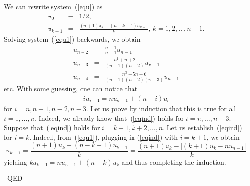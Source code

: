 \documentclass[12pt]{article}
\newenvironment{proof}{{\sc Proof:}}{~\hfill QED}
\begin{document}
\begin{proof}
We can rewrite system~(\ref{equ}) as
\begin{eqnarray}\label{equ1}
u_0&=&1/2, \\
u_{k-1}&=&\frac{{(n+1) u_{k}-(n-k-1)u_{k+1}}}{k}, \
k=1,2,\dots,n-1. \nonumber
\end{eqnarray}
Solving system~(\ref{equ1}) backwards, we obtain
\begin{eqnarray*}
u_{n-2} &=&\frac{n+1}{n-1} u_{n-1} ,\\
u_{n-3} &=&\frac{n^2+n+2}{(n-1)(n-2)} u_{n-1}\\
u_{n-4} &=&\frac{n^3+5n+6}{(n-1)(n-2)(n-3)} u_{n-1}
\end{eqnarray*}
etc. With some guessing, one can notice that
\begin{eqnarray}\label{eqind}
i u_{i-1}= n u_{n-1}+ (n-i) u_i
\end{eqnarray}
for $i=n,n-1,n-2,n-3$. Let us prove by induction that this is true
for all $i=1,\dots,n$. Indeed, we already know that~(\ref{eqind})
holds for $i=n,\dots,n-3$. Suppose that~(\ref{eqind}) holds for
$i=k+1,k+2,\dots,n$. Let us establish~(\ref{eqind}) for $i=k$.
Indeed, from~(\ref{equ1}), plugging in (\ref{eqind}) with $i=k+1$,
we obtain
$$
u_{k-1}=\frac{{(n+1) u_{k}-(n-k-1)u_{k+1}}}{k}
 =\frac{{(n+1) u_{k}-[(k+1) u_k-n u_{n-1}}]  }{k}
$$
yielding $k u_{k-1}= n u_{n-1}+ (n-k) u_k$ and thus completing the
induction.


\end{proof}
\end{document}
